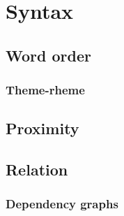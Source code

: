 \chapter{Syntax}
\label{chp:syntax}
\minitoc\mtcskip
\section{Word order}
\label{sect:wordorder}
\subsection{Theme-rheme}
\label{subsect:themerhema}
\section{Proximity}
\label{sect:proximity}
\section{Relation}
\label{sect:relation}
\subsection{Dependency graphs}
\label{subsect:depgraphs}
